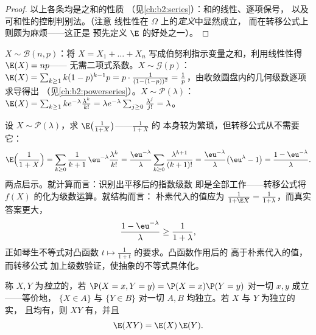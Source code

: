 \begin{proof}
以上各条均是之和的性质
（见\cref{ch:b2:series}）：和的线性、逐项保号，
以及可和性的控制判别法。（注意
线性性在 $\Omega$ 上的\emph{定义}中显然成立，
而在转移公式上则颇为麻烦——这正是
预先定义 $\E$ 的好处之一）。
\end{proof}

\begin{example}\label{ex:b2:randomvar:expectations}
$X \sim \mathcal{B}(n, p)$：将 $X = X_1 + \dots + X_n$
写成伯努利指示变量之和，利用线性性得 $\E(X) = np$——
无需二项式系数。$X \sim \mathcal{G}(p)$：$\E(X) =
\sum_{k\geq1}k(1-p)^{k-1}p = p\cdot\frac{1}{(1 - (1-p))^2} =
\frac1p$，由收敛圆盘内的几何级数逐项求导得出
（见\cref{ch:b2:powerseries}）。$X \sim \mathcal{P}(\lambda)$：$\E(X)
= \sum_{k\geq1}k e^{-\lambda}\frac{\lambda^k}{k!} = \lambda
e^{-\lambda}\sum_{j\geq0}\frac{\lambda^j}{j!} = \lambda$。
\end{example}

\begin{example}[转移公式的应用]\label{ex:b2:randomvar:transferex}
设 $X \sim \mathcal P(\lambda)$，求
$\E\bigl(\frac1{1+X}\bigr)$——$\frac1{1+X}$ 的
本身较为繁琐，但转移公式从不需要它：
\[
\E\Bigl(\frac1{1+X}\Bigr)
= \sum_{k\geq0}\frac{1}{k+1}\,\eu^{-\lambda}
\frac{\lambda^k}{k!}
= \frac{\eu^{-\lambda}}{\lambda}\sum_{k\geq0}
\frac{\lambda^{k+1}}{(k+1)!}
= \frac{\eu^{-\lambda}}{\lambda}\bigl(\eu^\lambda - 1\bigr)
= \frac{1 - \eu^{-\lambda}}{\lambda} .
\]
两点启示。就计算而言：识别出平移后的指数级数
即是全部工作——转移公式将
$f(X)$ 的化为级数运算。就结构而言：
朴素代入的值应为 $\frac1{1 + \E X} =
\frac1{1 + \lambda}$，而真实答案更大，
\[
\frac{1 - \eu^{-\lambda}}{\lambda} \geq
\frac{1}{1 + \lambda},
\]
正如琴生不等式对凸函数 $t
\mapsto \frac1{1+t}$ 的要求。凸函数作用后的
高于朴素代入的值，而转移公式
加上级数验证，使抽象的不等式具体化。
\end{example}

\begin{theorem}[独立性与乘积]\label{thm:b2:randomvar:product}
称 $X, Y$ 为\emph{独立}的，若 $\P(X = x, Y =
y) = \P(X = x)\P(Y = y)$ 对一切 $x, y$ 成立——等价地，
 $\{X \in A\}$ 与 $\{Y \in B\}$ 对一切 $A,
B$ 均独立。若 $X$ 与 $Y$ 为独立的实，
且均有，则 $XY$ 有，并且
\[
\E(XY) = \E(X)\,\E(Y) .
\]
\end{theorem}

